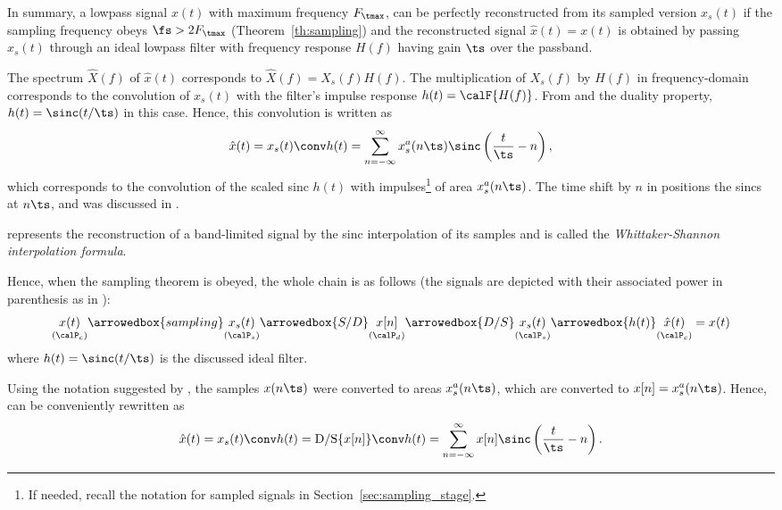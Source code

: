 In summary, a lowpass signal $x(t)$ with maximum frequency $F_\tmax$, can be perfectly reconstructed from its sampled version $x_s(t)$ if the sampling frequency obeys $\fs > 2 F_\tmax$ (Theorem~\ref{th:sampling}) and the reconstructed signal $\hat x(t) = x(t)$ is obtained by passing $x_s(t)$ through an ideal lowpass filter with frequency response $H(f)$ having gain $\ts$ over the passband.

The spectrum $\hat X(f)$ of $\hat x(t)$ corresponds to $\hat X(f) = X_s(f) H(f)$.
The multiplication of $X_s(f)$ by $H(f)$ in frequency-domain corresponds to the convolution of $x_s(t)$ with the filter's impulse response $h(t) = \calF \{ H(f) \}$. From  and the duality property, $h(t) = \sinc(t/\ts)$ in this case.
Hence, this convolution is written as
\begin{equation}
\hat x(t) = x_s(t) \conv h(t) = \sum_{n=-\infty}^\infty x_s^a(n \ts) \sinc\left( \frac{t}{\ts}-n \right),
\label{eq:signalReconstructionViaSincs}
\end{equation}
which corresponds to the convolution of the scaled sinc $h(t)$ 
 with impulses\footnote{If needed, recall the notation for sampled signals in Section~\ref{sec:sampling_stage}.} of area $x_s^a(n\ts)$. The time shift by $n$ in  positions the sincs at $n \ts$, and was discussed in .

 represents the reconstruction of a band-limited signal by the sinc interpolation of its samples and is called the \emph{Whittaker-Shannon interpolation formula}. 

Hence, when the sampling theorem is obeyed, the whole chain is as follows (the signals are depicted with their associated power in parenthesis as in ):
\begin{equation}
\underset{(\calP_c)}{x(t)} \arrowedbox{sampling} \underset{(\calP_s)}{x_s(t)} \arrowedbox{S/D} \underset{(\calP_d)}{x[n]} \arrowedbox{D/S} \underset{(\calP_s)}{x_s(t)} \arrowedbox{h(t)} \underset{(\calP_c)}{\hat x(t)}  = x(t)
\label{eq:samplingAndReconstruction}
\end{equation}
where $h(t) = \sinc(t/\ts)$ is the discussed ideal filter.

Using the notation suggested by , the samples $x(n\ts)$ were converted
to areas $x_s^a(n\ts)$, which are converted to $x[n]=x_s^a(n\ts)$. Hence,  can be conveniently rewritten as
\begin{equation}
\hat x(t) = x_s(t) \conv h(t) =  \textrm{D/S} \{ x[n] \} \conv h(t) = \sum_{n=-\infty}^\infty x[n] \sinc\left( \frac{t}{\ts}-n \right).
\label{eq:signalReconstructionViaSincs2}
\end{equation}

